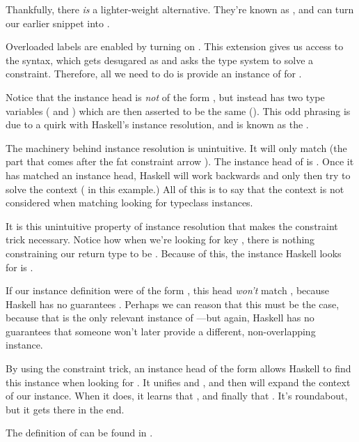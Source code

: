 \documentclass[book.tex]{subfiles}
\begin{document}
Thankfully, there \emph{is} a lighter-weight alternative. They're known as
, and can turn our earlier snippet into .

Overloaded labels are enabled by turning on . This
extension gives us access to the  syntax, which gets desugared as
 and asks the type system to solve a  constraint. Therefore, all we need to do is provide an instance of
 for .


Notice that the instance head is \emph{not} of the form
, but instead has two type variables ( and
) which are then asserted to be the same (). This odd
phrasing is due to a quirk with Haskell's instance resolution, and is known as
the .

The machinery behind instance resolution is unintuitive. It will only match
 (the part that comes after the fat
constraint arrow \hs{=>}). The instance head of 
is . Once it has matched an instance head, Haskell will work
backwards and only then try to solve the context ( in this
example.) All of this is to say that the context is not considered when matching
looking for typeclass instances.

It is this unintuitive property of instance resolution that makes the constraint
trick necessary. Notice how when we're looking for key , there is
nothing constraining our return type to be . Because of this, the
instance Haskell looks for is .

If our instance definition were of the form ,
this head \emph{won't} match , because Haskell has no
guarantees . Perhaps we can reason that this must be the case,
because that is the only relevant instance of ---but again, Haskell
has no guarantees that someone won't later provide a different, non-overlapping
instance.

By using the constraint trick, an instance head of the form  allows Haskell to find this instance when looking for . It unifies  and , and then will
expand the context of our instance. When it does, it learns that , and finally that . It's roundabout, but it gets there
in the end.

The definition of  can be found in .
\end{document}
